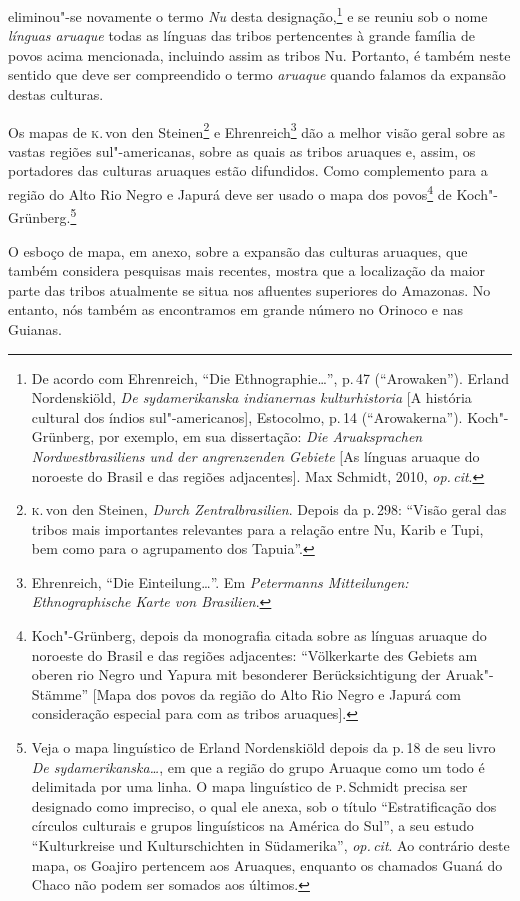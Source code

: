 eliminou"-se novamente o termo \textit{Nu} desta designação,\footnote{De acordo
  com Ehrenreich, ``Die Ethnographie\ldots'', p.\,47 (``Arowaken''). Erland Nordenskiöld,
  \textit{De sydamerikanska indianernas kulturhistoria} {[}A história
  cultural dos índios sul"-americanos{]}, Estocolmo, p.\,14
  (``Arowakerna''). Koch"-Grünberg, por exemplo, em sua dissertação:
  \textit{Die Aruaksprachen Nordwestbrasiliens und der angrenzenden
  Gebiete} {[}As línguas aruaque do noroeste do Brasil e das regiões
  adjacentes{]}. Max Schmidt, 2010, \textit{op.\,cit}.} e se
reuniu sob o nome \textit{línguas aruaque} todas as línguas das tribos
pertencentes à grande família de povos acima mencionada, incluindo assim
as tribos Nu. Portanto, é também neste sentido que deve ser compreendido o
termo \textit{aruaque} quando falamos da expansão destas culturas.

Os mapas de \textsc{k}.\,von den Steinen\footnote{\textsc{k}.\,von den Steinen, \textit{Durch
  Zentralbrasilien}. Depois da p.\,298: ``Visão geral das
  tribos mais importantes relevantes para a relação entre Nu, Karib e
  Tupi, bem como para o agrupamento dos Tapuia''.} e
Ehrenreich\footnote{Ehrenreich, ``Die Einteilung\ldots''. Em \textit{Petermanns Mitteilungen: Ethnographische Karte von Brasilien}.}
dão a melhor visão geral sobre as vastas regiões sul"-americanas, sobre
as quais as tribos aruaques e, assim, os portadores das culturas aruaques
estão difundidos. Como complemento para a região do Alto Rio Negro e
Japurá deve ser usado o mapa dos povos\footnote{Koch"-Grünberg, depois da
  monografia citada sobre as línguas aruaque do noroeste do Brasil e das
  regiões adjacentes: ``Völkerkarte des Gebiets am oberen rio Negro und
  Yapura mit besonderer Berücksichtigung der Aruak"-Stämme'' {[}Mapa dos
  povos da região do Alto Rio Negro e Japurá com consideração especial
  para com as tribos aruaques{]}.} de Koch"-Grünberg.\footnote{Veja o mapa
  linguístico de Erland Nordenskiöld depois da p.\,18 de seu livro
  \textit{De sydamerikanska\ldots}, em que a região
  do grupo Aruaque como um todo é delimitada por uma linha.
  O mapa linguístico de \textsc{p}.\,Schmidt precisa ser designado como impreciso,
  o qual ele anexa, sob o título ``Estratificação dos círculos
  culturais e grupos linguísticos na América do Sul'', a seu estudo
  ``Kulturkreise und Kulturschichten in Südamerika'', \textit{op.\,cit}. Ao
  contrário deste mapa, os Goajiro pertencem aos Aruaques, enquanto os
  chamados Guaná do Chaco não podem ser somados aos últimos.}

O esboço de mapa, em anexo, sobre a expansão das culturas aruaques, que
também considera pesquisas mais recentes, mostra que a localização da
maior parte das tribos atualmente se situa nos afluentes
superiores do Amazonas. No entanto, nós também as encontramos em grande
número no Orinoco e nas Guianas. 

